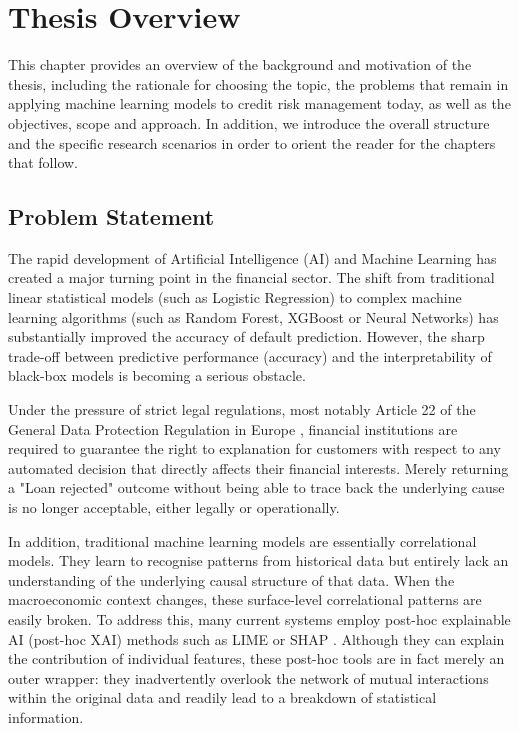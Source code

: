 \section{Thesis Overview}
\noindent
This chapter provides an overview of the background and motivation of the thesis, including the rationale for choosing the topic, the problems that remain in applying machine learning models to credit risk management today, as well as the objectives, scope and approach. In addition, we introduce the overall structure and the specific research scenarios in order to orient the reader for the chapters that follow.

\subsection{Problem Statement}
\noindent
The rapid development of Artificial Intelligence (AI) and Machine Learning has created a major turning point in the financial sector. The shift from traditional linear statistical models (such as Logistic Regression) to complex machine learning algorithms (such as Random Forest, XGBoost or Neural Networks) has substantially improved the accuracy of default prediction. However, the sharp trade-off between predictive performance (accuracy) and the interpretability of black-box models is becoming a serious obstacle.

Under the pressure of strict legal regulations, most notably Article 22 of the General Data Protection Regulation in Europe \cite{european2016gdpr}, financial institutions are required to guarantee the right to explanation for customers with respect to any automated decision that directly affects their financial interests. Merely returning a "Loan rejected" outcome without being able to trace back the underlying cause is no longer acceptable, either legally or operationally.

In addition, traditional machine learning models are essentially correlational models. They learn to recognise patterns from historical data but entirely lack an understanding of the underlying causal structure of that data. When the macroeconomic context changes, these surface-level correlational patterns are easily broken. To address this, many current systems employ post-hoc explainable AI (post-hoc XAI) methods such as LIME \cite{ribeiro2016trust} or SHAP \cite{lundberg2017unified}. Although they can explain the contribution of individual features, these post-hoc tools are in fact merely an outer wrapper: they inadvertently overlook the network of mutual interactions within the original data and readily lead to a breakdown of statistical information.


